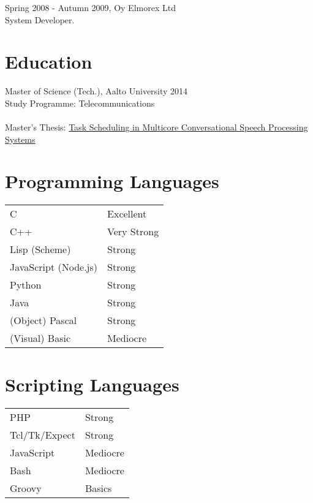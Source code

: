 \documentclass[12pt]{article}
\begin{document}
\large{Spring 2008 - Autumn 2009, Oy Elmorex Ltd}\\
\normalsize{System Developer.}\\


\section*{Education}

\large{Master of Science (Tech.), Aalto University 2014}\\
\normalsize{
Study Programme: Telecommunications\\
\\
Master's Thesis:
\href{https://aaltodoc.aalto.fi/bitstream/handle/123456789/14402/master_
Lindroos_Michele_2014.pdf?sequence=1}
{Task Scheduling in Multicore Conversational Speech Processing Systems}
}


\section*{Programming Languages}

\begin{tabular}{ll}
C & Excellent\\
C++ & Very Strong\\
Lisp (Scheme) & Strong\\
JavaScript (Node.js) & Strong\\
Python & Strong\\
Java & Strong\\
(Object) Pascal & Strong\\
(Visual) Basic & Mediocre
\end{tabular}


\section*{Scripting Languages}

\begin{tabular}{ll}
PHP & Strong\\
Tcl/Tk/Expect & Strong\\
JavaScript & Mediocre\\
Bash & Mediocre\\
Groovy & Basics\\
\end{tabular}
\end{document}
